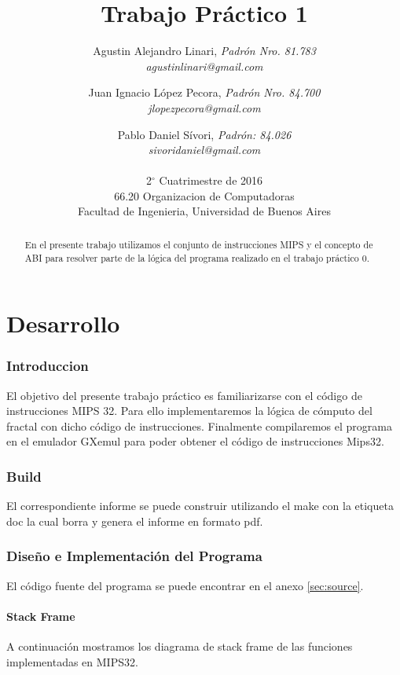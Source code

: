 \documentclass{article}
\title{Trabajo Práctico 1}
\author{
  Agustin Alejandro Linari, \textit{Padrón Nro. 81.783}\\
  \textit{agustinlinari@gmail.com}\\
  \and
  Juan Ignacio López Pecora, \textit{Padrón Nro. 84.700}\\
  \textit{jlopezpecora@gmail.com}\\
  \and
  Pablo Daniel Sívori, \textit{Padrón: 84.026}\\
  \textit{sivoridaniel@gmail.com}\\
  \\
  \normalsize{2$^{\circ}$ Cuatrimestre de 2016}                           \\
  \normalsize{66.20 Organizacion de Computadoras}                  \\
  \normalsize{Facultad de Ingenieria, Universidad de Buenos Aires} \\
}
\begin{document}

\maketitle


\begin{abstract}
En el presente trabajo utilizamos el conjunto de instrucciones MIPS y el concepto de ABI para resolver parte de la lógica del programa realizado en el trabajo práctico 0. 
\end{abstract}

\clearpage

\tableofcontents
\clearpage

\part{Desarrollo}

\section{Introduccion}

El objetivo del presente trabajo práctico es familiarizarse con el código de instrucciones MIPS 32. Para ello implementaremos la lógica de cómputo del fractal con dicho código de instrucciones. 
Finalmente compilaremos el programa en el emulador GXemul para poder obtener el código de instrucciones Mips32.

\section{Build}
El correspondiente informe se puede construir utilizando el make con la etiqueta doc la cual borra y genera el informe en formato pdf.

\section{Diseño e Implementación del Programa}

El código fuente del programa se puede encontrar en el anexo \ref{sec:source}.

\subsection{Stack Frame}
A continuación mostramos los diagrama de stack frame de las funciones implementadas en MIPS32.
\end{document}

